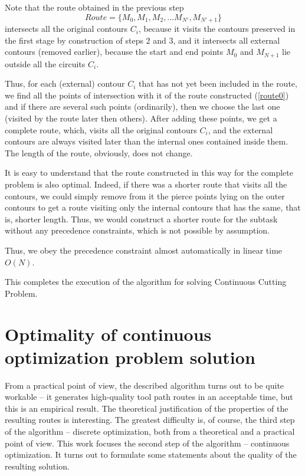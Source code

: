 \documentclass[]{interact}
\theoremstyle{plain}%
\theoremstyle{definition}
\theoremstyle{remark}
\begin{document}
Note that the route obtained in the previous step
\begin{equation}
Route = \{ M_0, M_1, M_2, \dots M_{N'}, M_{N'+1}\}
\label{route0}
\end{equation}
intersects all the original contours
$C_i$,
because it visits the contours preserved in the first stage
by construction of steps 2 and 3,
and it intersects all external contours
(removed earlier),
because the start and end points
$M_0$ and
$M_{N + 1}$
lie outside all the circuits
$C_i$.

Thus,
for each (external) contour
$C_i$
that has not yet been included in the route,
we find all the points of intersection
with it of the route constructed
(\ref{route0})
and if there are several such points (ordinarily),
then we choose the last one
(visited by the route later then others).
After adding these points,
we get a complete route,
which,
visits all the original contours
$C_i$,
and the external contours are always visited later than
the internal ones contained inside them.
The length of the route, obviously, does not change.

It is easy to understand
that the route constructed in this way
for the complete problem
is also optimal.
Indeed,
if there was a shorter route
that visits all the contours,
we could simply remove from it
the pierce points
lying on the outer contours to get a route
visiting only the internal contours
that has the same, that is, shorter length.
Thus, we would construct a shorter route
for the subtask without any precedence constraints,
which is not possible by assumption.

Thus,
we obey the precedence constraint
almost automatically in linear time
$O(N)$.

This completes the execution of the algorithm
for solving Continuous Cutting Problem.

\section{Optimality of continuous optimization problem solution}

From a practical point of view,
the described algorithm turns out to be quite workable --
it generates high-quality tool path routes in an acceptable time,
but this is an empirical result.
The theoretical justification of the properties
of the resulting routes is interesting.
The greatest difficulty is, of course,
the third step of the algorithm --
discrete optimization,
both from a theoretical and a
practical point of view.
This work focuses the second step of the algorithm --
continuous optimization.
It turns out to formulate some statements
about the quality of the resulting solution.
\end{document}

